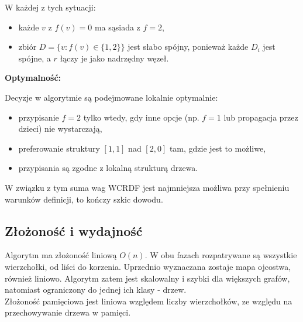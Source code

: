 W każdej z tych sytuacji:
\begin{itemize}
\item każde $v$ z $f(v)=0$ ma sąsiada z $f=2$,
\item zbiór $D = \{v : f(v) \in \{1,2\}\}$ jest słabo spójny, ponieważ każde $D_i$ jest spójne, a $r$ łączy je jako nadrzędny węzeł.
\end{itemize}
\textbf{Optymalność:}

Decyzje w algorytmie są podejmowane lokalnie optymalnie:
\begin{itemize}
\item przypisanie $f = 2$ tylko wtedy, gdy inne opcje (np. $f=1$ lub propagacja przez dzieci) nie wystarczają,
\item preferowanie struktury $[1,1]$ nad $[2,0]$ tam, gdzie jest to możliwe,
\item przypisania są zgodne z lokalną strukturą drzewa.
\end{itemize}

W związku z tym suma wag WCRDF jest najmniejsza możliwa przy spełnieniu warunków definicji, to kończy szkic dowodu.

\subsection{Złożoność i wydajność}
Algorytm ma złożoność liniową $O(n)$. W obu fazach rozpatrywane są wszystkie wierzchołki, od liści do korzenia. Uprzednio wyznaczana zostaje mapa ojcostwa, również liniowo. Algorytm zatem jest skalowalny i szybki dla większych grafów, natomiast ograniczony do jednej ich klasy - drzew.\\ Złożoność pamięciowa jest liniowa względem liczby wierzchołków, ze względu na przechowywanie drzewa w pamięci.

